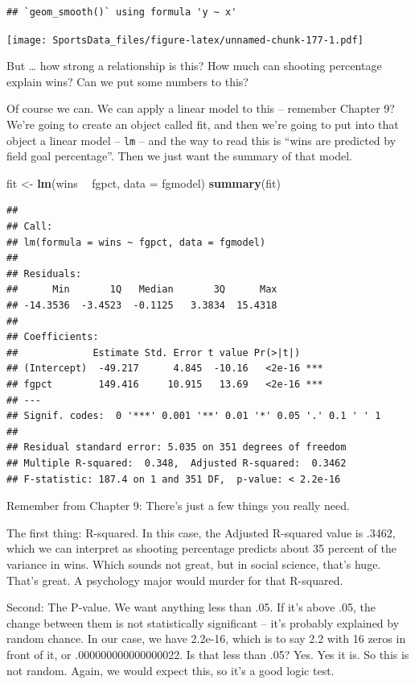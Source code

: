 \documentclass[]{book}
\newenvironment{Shaded}{\begin{snugshade}}{\end{snugshade}}
\newcommand{\DataTypeTok}[1]{\textcolor[rgb]{0.13,0.29,0.53}{#1}}
\newcommand{\KeywordTok}[1]{\textcolor[rgb]{0.13,0.29,0.53}{\textbf{#1}}}
\newcommand{\NormalTok}[1]{#1}
\newcommand{\OperatorTok}[1]{\textcolor[rgb]{0.81,0.36,0.00}{\textbf{#1}}}
\newcommand{\StringTok}[1]{\textcolor[rgb]{0.31,0.60,0.02}{#1}}
\begin{document}
\begin{verbatim}
## `geom_smooth()` using formula 'y ~ x'
\end{verbatim}

\texttt{[image: SportsData\_files/figure-latex/unnamed-chunk-177-1.pdf]}

But \ldots{} how strong a relationship is this? How much can shooting percentage explain wins? Can we put some numbers to this?

Of course we can. We can apply a linear model to this -- remember Chapter 9? We're going to create an object called fit, and then we're going to put into that object a linear model -- \texttt{lm} -- and the way to read this is ``wins are predicted by field goal percentage''. Then we just want the summary of that model.

\begin{Shaded}
\begin{Highlighting}[]
\NormalTok{fit <-}\StringTok{ }\KeywordTok{lm}\NormalTok{(wins }\OperatorTok{~}\StringTok{ }\NormalTok{fgpct, }\DataTypeTok{data =}\NormalTok{ fgmodel)}
\KeywordTok{summary}\NormalTok{(fit)}
\end{Highlighting}
\end{Shaded}

\begin{verbatim}
## 
## Call:
## lm(formula = wins ~ fgpct, data = fgmodel)
## 
## Residuals:
##      Min       1Q   Median       3Q      Max 
## -14.3536  -3.4523  -0.1125   3.3834  15.4318 
## 
## Coefficients:
##             Estimate Std. Error t value Pr(>|t|)    
## (Intercept)  -49.217      4.845  -10.16   <2e-16 ***
## fgpct        149.416     10.915   13.69   <2e-16 ***
## ---
## Signif. codes:  0 '***' 0.001 '**' 0.01 '*' 0.05 '.' 0.1 ' ' 1
## 
## Residual standard error: 5.035 on 351 degrees of freedom
## Multiple R-squared:  0.348,  Adjusted R-squared:  0.3462 
## F-statistic: 187.4 on 1 and 351 DF,  p-value: < 2.2e-16
\end{verbatim}

Remember from Chapter 9: There's just a few things you really need.

The first thing: R-squared. In this case, the Adjusted R-squared value is .3462, which we can interpret as shooting percentage predicts about 35 percent of the variance in wins. Which sounds not great, but in social science, that's huge. That's great. A psychology major would murder for that R-squared.

Second: The P-value. We want anything less than .05. If it's above .05, the change between them is not statistically significant -- it's probably explained by random chance. In our case, we have 2.2e-16, which is to say 2.2 with 16 zeros in front of it, or .000000000000000022. Is that less than .05? Yes. Yes it is. So this is not random. Again, we would expect this, so it's a good logic test.
\end{document}
